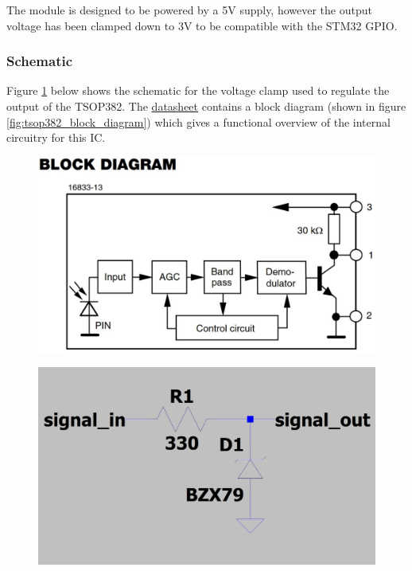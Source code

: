 The module is designed to be powered by a 5V supply, however the output voltage has been clamped down to 3V to be compatible with the STM32 GPIO.

\subsubsection{Schematic}
Figure \ref{fig:schematic_voltage_clamp} below shows the schematic for the voltage clamp used to regulate the output of the TSOP382. The \href{https://www.vishay.com/docs/82491/tsop382.pdf}{datasheet} contains a block diagram (shown in figure \ref{fig:tsop382_block_diagram}) which gives a functional overview of the internal circuitry for this IC.


\begin{figure}[H]
	\centering
	\begin{minipage}{.5\textwidth}
		\centering
		\includegraphics[width=.8\linewidth]{figures/design/TSOP382_block_diagram}
		\label{fig:tsop382_block_diagram}
	\end{minipage}%
	\begin{minipage}{.5\textwidth}
		\centering
		\includegraphics[width=.8\linewidth]{figures/design/over_voltage_protection}
		\label{fig:schematic_voltage_clamp}
	\end{minipage}
\end{figure}

